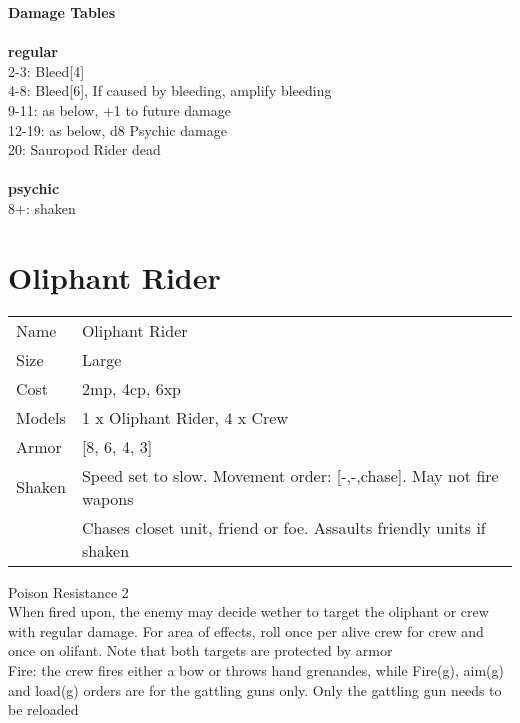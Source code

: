 {\bf Damage Tables} \\
\ \\ {\bf regular } \\
2-3: Bleed[4] \\
4-8: Bleed[6], If caused by bleeding, amplify bleeding \\
9-11: as below, +1 to future damage \\
12-19: as below, d8 Psychic damage \\
20: Sauropod Rider dead \\
\ \\ {\bf psychic } \\
8+: shaken \\










\pagebreak\pagebreak

\section{ Oliphant Rider }

\begin{tabular}{ll}
  Name & Oliphant Rider \\
  Size & Large\\
  Cost & 2mp, 4cp, 6xp\\
  Models & 1 x Oliphant Rider, 4 x Crew\\
  Armor & [8, 6, 4, 3]\\
  Shaken & Speed set to slow. Movement order: [-,-,chase]. May not fire wapons\\ &Chases closet unit, friend or foe. Assaults friendly units if shaken\\
\end{tabular}

\noindent Poison Resistance 2\\ 
When fired upon, the enemy may decide wether to target the oliphant or crew with regular damage. For area of effects, roll once per alive crew for crew and once on olifant. Note that both targets are protected by armor\\ 
Fire: the crew fires either a bow or throws hand grenandes, while Fire(g), aim(g) and load(g) orders are for the gattling guns only. Only the gattling gun needs to be reloaded\\ 


